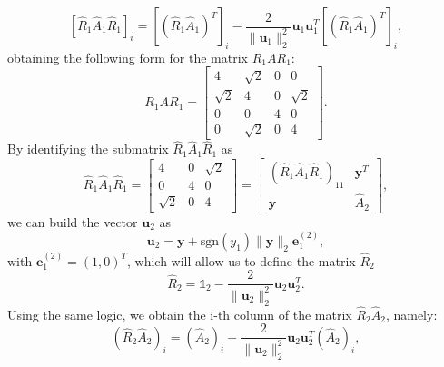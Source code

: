 \documentclass[a4paper,11pt]{article}
\begin{document}
 \begin{equation}\label{key}
	\left[ \hat{R}_1 \hat{A}_1 \hat{R}_1 \right]_i = 	\left[ (\hat{R}_1 \hat{A}_1 )^T \right]_i  - \frac{2}{\lVert \textbf{u}_1\rVert_2^2} \textbf{u}_1 \textbf{u}_1^T	\left[ (\hat{R}_1 \hat{A}_1 )^T \right]_i ,
\end{equation}
obtaining the following form for the matrix $R_1 A R_1 $:
\begin{equation}\label{key}
		R_1 A R_1 = \left[ \begin{array}{cccc}
		4 & \sqrt{2} & 0 & 0 \\
		\sqrt{2} & 4 & 0 & \sqrt{2} \\
		0 & 0 & 4 & 0 \\
		0 & \sqrt{2} & 0 & 4
	\end{array} \right] .
\end{equation}
By identifying the submatrix $	\hat{R}_1 \hat{A}_1 \hat{R}_1$ as
\begin{equation}\label{key}
	\hat{R}_1 \hat{A}_1 \hat{R}_1 = \left[ \begin{array}{ccc}
		4 & 0 & \sqrt{2} \\
		0 & 4 & 0 \\
		\sqrt{2} & 0 & 4
	\end{array} \right]  =  \left[ \begin{array}{cc}
	(\hat{R}_1 \hat{A}_1 \hat{R}_1)_{11}& \textbf{y}^T \\
	\textbf{y} & \hat{A}_2 
\end{array} \right],
\end{equation}	
we can build the vector $\textbf{u}_2 $ as
\begin{equation}\label{key}
	\textbf{u}_2 = \textbf{y} + \text{sgn}(y_1) \lVert \textbf{y}\rVert_2\textbf{e}_1^{(2)},
\end{equation}	
with $ \textbf{e}_1^{(2)} = (1,0)^T $, which will allow us to define the matrix $\hat{R}_2$
\begin{equation}\label{key}
	\hat{R}_2 = \mathbb{1}_2 - \frac{2}{\lVert \textbf{u}_2\rVert_2^2} \textbf{u}_2 \textbf{u}_2^T.
\end{equation}
Using the same logic, we obtain the i-th column of the matrix $\hat{R}_2\hat{A}_2$, namely:
\begin{equation}\label{key}
	( \hat{R}_2\hat{A}_2)_i = (\hat{A}_2)_i - \frac{2}{\lVert \textbf{u}_2\rVert_2^2} \textbf{u}_2 \textbf{u}_2^T(\hat{A}_2)_i,
\end{equation}
\end{document}
